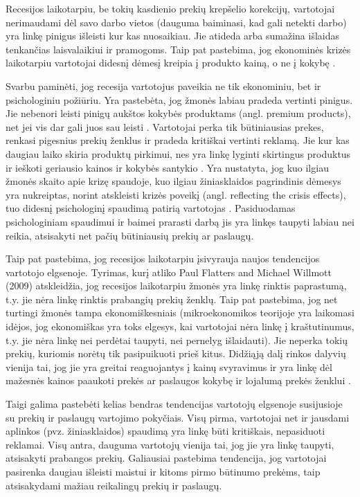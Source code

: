 \documentclass[l1pt, titlepage]{article}
\begin{document}
Recesijos laikotarpiu, be tokių kasdienio prekių krepšelio korekcijų, vartotojai nerimaudami dėl savo darbo vietos (dauguma baiminasi, kad gali netekti darbo) yra linkę pinigus išleisti kur kas nuosaikiau. Jie atideda arba sumažina išlaidas tenkančias laisvalaikiui ir pramogoms. Taip pat pastebima, jog ekonominės krizės laikotarpiu vartotojai didesnį dėmesį kreipia į produkto  kainą, o ne į kokybę \cite{mansoor2011global} .

Svarbu paminėti, jog recesija vartotojus paveikia ne tik ekonominiu, bet ir psichologiniu požiūriu. Yra pastebėta, jog žmonės labiau pradeda vertinti pinigus. Jie nebenori leisti pinigų aukštos kokybės produktams (angl. premium products), net jei vis dar gali juos sau leisti \cite{mansoor2011global}. Vartotojai perka tik būtiniausias prekes, renkasi pigesnius prekių ženklus ir pradeda kritiškai vertinti reklamą. Jie kur kas daugiau laiko skiria produktų pirkimui, nes yra linkę lyginti skirtingus produktus ir ieškoti geriausio kainos ir kokybės santykio \cite{nistorescu2009marketing}.
Yra nustatyta, jog kuo ilgiau žmonės skaito apie  krizę spaudoje, kuo ilgiau žiniasklaidos pagrindinis dėmesys yra nukreiptas, norint atskleisti krizės poveikį (angl. reflecting the crisis effects), tuo didesnį psichologinį spaudimą patirią vartotojas \cite{amalia2009consumers}. Pasiduodamas psichologiniam spaudimui ir baimei prarasti darbą jis yra linkęs taupyti labiau nei reikia, atsisakyti net pačių būtiniausių prekių ar paslaugų.

Taip pat pastebima, jog recesijos laikotarpiu įsivyrauja naujos tendencijos vartotojo elgsenoje. Tyrimas, kurį atliko Paul Flatters and Michael Willmott (2009) atskleidžia, jog recesijos laikotarpiu žmonės yra linkę rinktis paprastumą, t.y. jie nėra linkę rinktis prabangių prekių ženklų. Taip pat pastebima, jog net turtingi žmonės tampa ekonomiškesniais (mikroekonomikos teorijoje yra laikomasi idėjos, jog ekonomiškas yra toks elgesys, kai vartotojai nėra linkę į kraštutinumus, t.y. jie nėra linkę nei perdėtai taupyti, nei pernelyg išlaidauti). Jie neperka tokių prekių, kuriomis norėtų tik pasipuikuoti prieš kitus. Didžiąją dalį rinkos dalyvių vienija tai, jog jie yra greitai reaguojantys į kainų svyravimus ir yra linkę dėl mažesnės kainos paaukoti prekės ar paslaugos kokybę ir lojalumą prekės ženklui \cite{flatters2009understanding}.

Taigi galima pastebėti kelias bendras tendencijas vartotojų elgsenoje susijusioje su prekių ir paslaugų vartojimo pokyčiais. Visų pirma, vartotojai net ir jausdami aplinkos (pvz. žiniasklaidos) spaudimą yra linkę būti kritiškais, nepasiduoti reklamai. Visų antra, dauguma vartotojų vienija tai, jog jie yra linkę taupyti, atsisakyti prabangos prekių. Galiausiai pastebima tendencija, jog vartotojai pasirenka daugiau išleisti maistui ir kitoms pirmo būtinumo prekėms, taip atsisakydami mažiau reikalingų prekių ir paslaugų.
\end{document}
